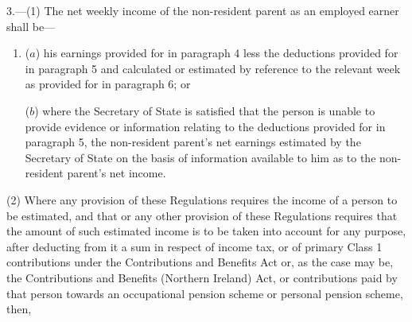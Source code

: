 \documentclass[12pt,a4paper]{article}
\begin{document}
3.---(1)  The net weekly income of the non-resident parent as an employed earner shall be—
\begin{enumerate}\item[]
($a$) his earnings provided for in paragraph 4 less the deductions provided for in paragraph 5 and calculated or estimated by reference to the relevant week as provided for in paragraph 6; or

($b$) where the Secretary of State is satisfied that the person is unable to provide evidence or information relating to the deductions provided for in paragraph 5, the non-resident parent’s net earnings estimated by the Secretary of State on the basis of information available to him as to the non-resident parent’s net income.
\end{enumerate}

(2) Where any provision of these Regulations requires the income of a person to be estimated, and that or any other provision of these Regulations requires that the amount of such estimated income is to be taken into account for any purpose, after deducting from it a sum in respect of income tax, or of primary Class 1 contributions under the Contributions and Benefits Act or, as the case may be, the Contributions and Benefits (Northern Ireland) Act, or contributions paid by that person towards an occupational pension scheme or personal pension scheme, then,
\end{document}
